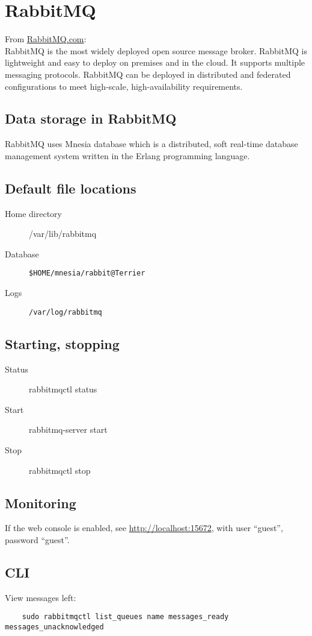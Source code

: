\section{RabbitMQ}
From \href{http://www.rabbitmq.com/}{RabbitMQ.com}: \hfill \\
RabbitMQ is the most widely deployed open source message broker.  RabbitMQ is lightweight and easy to deploy on premises and in the cloud. It supports multiple messaging protocols. RabbitMQ can be deployed in distributed and federated configurations to meet high-scale, high-availability requirements. 

	\subsection{Data storage in RabbitMQ}
	RabbitMQ uses Mnesia database which is a distributed, soft real-time database management system written in the Erlang programming language.

	\subsection{Default file locations}
	\begin{description}
		\item[Home directory] /var/lib/rabbitmq \\
		\item[Database] \verb+$HOME/mnesia/rabbit@Terrier+ \\
		\item[Logs] \verb+/var/log/rabbitmq+
	\end{description}



	\subsection{Starting, stopping}
	\begin{description}
		\item[Status] rabbitmqctl status
		\item[Start] rabbitmq-server start
		\item[Stop] rabbitmqctl stop
	\end{description}


	\subsection{Monitoring}
	If the web console is enabled, see \url{http://localhost:15672}, with user ``guest'', password ``guest''.

	\subsection{CLI}
	View messages left:
	\begin{lstlisting}
	sudo rabbitmqctl list_queues name messages_ready messages_unacknowledged
	\end{lstlisting}
